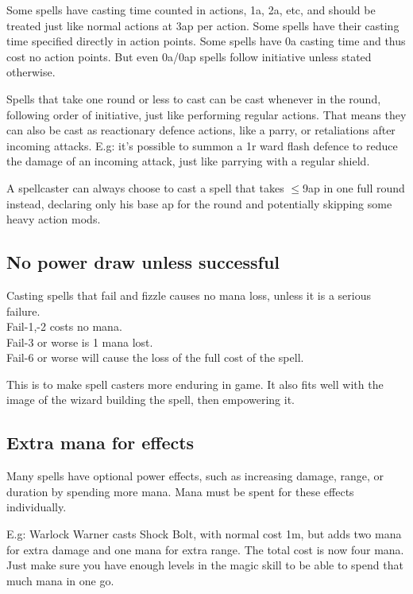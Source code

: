Some spells have casting time counted in actions, 1a, 2a, etc, and should be treated just like normal actions at 3ap per action. Some spells have their casting time specified directly in action points. Some spells have 0a casting time and thus cost no action points. But even 0a/0ap spells follow initiative unless stated otherwise.

Spells that take one round or less to cast can be cast whenever in the round, following order of initiative, just like performing regular actions. That means they can also be cast as reactionary defence actions, like a parry, or retaliations after incoming attacks.
E.g: it's possible to summon a 1r ward flash defence to reduce the damage of an incoming attack, just like parrying with a regular shield.

A spellcaster can always choose to cast a spell that takes $\le$9ap in one full round instead, declaring only his base ap for the round and potentially skipping some heavy action mods. 


\subsection*{No power draw unless successful}
Casting spells that fail and fizzle causes no mana loss, unless it is a serious failure.\\
Fail-1,-2 costs no mana. \\
Fail-3 or worse is 1 mana lost. \\
Fail-6 or worse will cause the loss of the full cost of the spell.

This is to make spell casters more enduring in game. It also fits well with the image of the wizard building the spell, then empowering it.


\subsection*{Extra mana for effects}
Many spells have optional power effects, such as increasing damage, range, or duration by spending more mana. Mana must be spent for these effects individually.

E.g: Warlock Warner casts Shock Bolt, with normal cost 1m, but adds two mana for extra damage and one mana for extra range. The total cost is now four mana.
Just make sure you have enough levels in the magic skill to be able to spend that much mana in one go.


